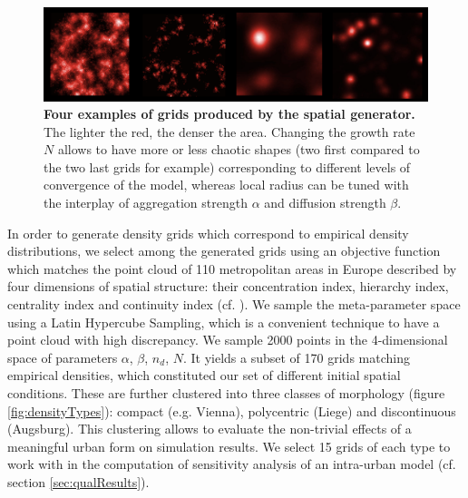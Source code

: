 \documentclass[preprint,5p,times,twocolumn,authoryear]{elsarticle}
\begin{document}
\begin{figure}[htbp] \begin{center} 
	\includegraphics[width=\linewidth]{figures/spatialGen.png}
 \caption{\textbf{Four examples of grids produced by the spatial generator.} The lighter the red, the denser the area. Changing the growth rate $N$ allows to have more or less chaotic shapes (two first compared to the two last grids for example) corresponding to different levels of convergence of the model, whereas local radius can be tuned with the interplay of aggregation strength $\alpha$ and diffusion strength $\beta$. }
\label{fig:spatialGen}
\end{center}
\end{figure} %



In order to generate density grids which correspond to empirical density distributions, we select among the generated grids using an objective function which matches the point cloud of 110 metropolitan areas in Europe described by four dimensions of spatial structure: their concentration index, hierarchy index, centrality index and continuity index (cf. \cite{LeNechet2015}). We sample the meta-parameter space using a Latin Hypercube Sampling, which is a convenient technique to have a point cloud with high discrepancy. We sample 2000 points in the 4-dimensional space of parameters {$\alpha$, $\beta$, $n_d$, $N$}. It yields a subset of 170  grids matching empirical densities, which constituted our set of different initial spatial conditions. These are further clustered into three classes of morphology (figure \ref{fig:densityTypes}): compact (e.g. Vienna), polycentric (Liege) and discontinuous (Augsburg). This clustering allows to evaluate the non-trivial effects of a meaningful urban form on simulation results. We select 15 grids of each type to work with in the computation of sensitivity analysis of an intra-urban model (cf. section \ref{sec:qualResults}).
\end{document}
